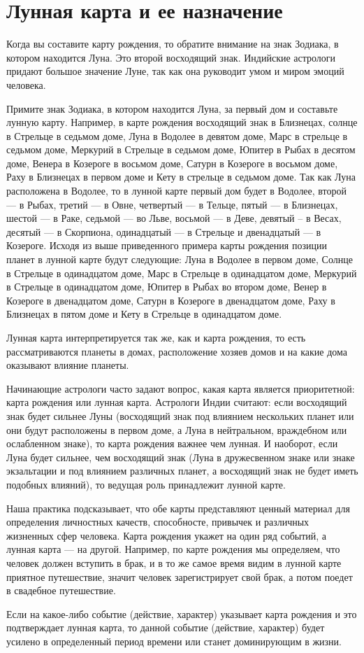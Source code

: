 \section{Лунная карта и ее назначение}

Когда вы составите карту рождения, то обратите внимание на знак Зодиака, в котором находится Луна. Это второй восходящий знак. Индийские астрологи придают большое значение Луне, так как она руководит умом и миром эмоций человека.

Примите знак Зодиака, в котором находится Луна, за первый дом и составьте лунную карту. Например, в карте рождения восходящий знак в Близнецах, солнце в Стрельце в седьмом доме, Луна в Водолее в девятом доме, Марс в стрельце в седьмом доме, Меркурий в Стрельце в седьмом доме, Юпитер в Рыбах в десятом доме, Венера в Козероге в восьмом доме, Сатурн в Козероге в восьмом доме, Раху в Близнецах в первом доме и Кету в стрельце в седьмом доме. Так как Луна расположена в Водолее, то в лунной карте первый дом будет в Водолее, второй --- в Рыбах, третий --- в Овне, четвертый --- в Тельце, пятый --- в Близнецах, шестой --- в Раке, седьмой --- во Льве, восьмой --- в Деве, девятый -- в Весах, десятый --- в Скорпиона, одинадцатый --- в Стрельце и двенадцатый --- в Козероге. Исходя из выше приведенного примера карты рождения позиции планет в лунной карте будут следующие: Луна в Водолее в первом доме, Солнце в Стрельце в одинадцатом доме, Марс в Стрельце в одинадцатом доме, Меркурий в Стрельце в одинадцатом доме, Юпитер в Рыбах во втором доме, Венер в Козероге в двенадцатом доме, Сатурн в Козероге в двенадцатом доме, Раху в Близнецах в пятом доме и Кету в Стрельце в одинадцатом доме.

Лунная карта интерпретируется так же, как и карта рождения, то есть рассматриваются планеты в домах, расположение хозяев домов и на какие дома оказывают влияние планеты.

Начинающие астрологи часто задают вопрос, какая карта является приоритетной: карта рождения или лунная карта. Астрологи Индии считают: если восходящий знак будет сильнее Луны (восходящий знак под влиянием нескольких планет или они будут расположены в первом доме, а Луна в нейтральном, враждебном или ослабленном знаке), то карта рождения важнее чем лунная. И наоборот, если Луна будет сильнее, чем восходящий знак (Луна в дружесвенном знаке или знаке экзальтации и под влиянием различных планет, а восходящий знак не будет иметь подобных влияний), то ведущая роль принадлежит лунной карте.

Наша практика подсказывает, что обе карты представляют ценный материал для определения личностных качеств, способносте, привычек и различных жизненных сфер человека. Карта рождения укажет на один ряд событий, а лунная карта --- на другой. Например, по карте рождения мы определяем, что человек должен вступить в брак, и в то же самое время видим в лунной карте приятное путешествие, значит человек зарегистрирует свой брак, а потом поедет в свадебное путешествие.

Если на какое-либо событие (действие, характер) указывает карта рождения и это подтверждает лунная карта, то данной событие (действие, характер) будет усилено в определенный период времени или станет доминирующим в жизни.
